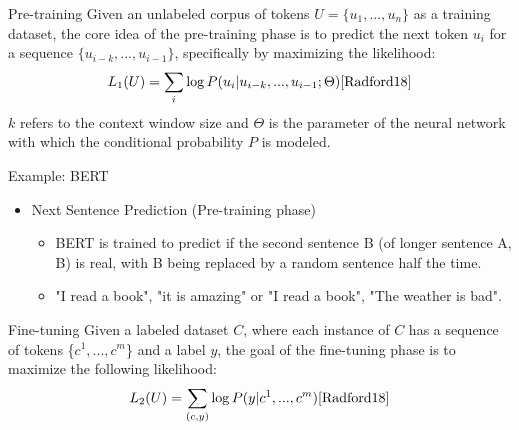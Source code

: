 \documentclass[t]{beamer}
\begin{document}
\begin{frame}{Pre-training}
Given an unlabeled corpus of tokens $U=\{u_1,...,u_n\}$ as a training dataset, the core idea of the pre-training phase is to 
predict the next token $u_i$ for a sequence $\{u_{i-k},...,u_{i-1}\}$, specifically by maximizing the likelihood: 
\begin{equation}
  L_1(U) = \sum_{i}\log{P(u_i|u_{i-k},...,u_{i-1}; \Theta)} \cite{Radford18}
\end{equation}
$k$ refers to the context window size and $\Theta$ is the parameter of the neural network with which the conditional probability $P$ is modeled.
\end{frame}


\begin{frame}{Example: BERT \cite{Devlin18}}
  \vspace{1cm}
  \begin{itemize}
    \item Next Sentence Prediction (Pre-training phase)
    \begin{itemize}
      \item BERT is trained to predict if the second sentence B (of longer sentence A, B) is real, with B being replaced by a random sentence half the time.
      \item "I read a book", "it is amazing" or "I read a book", "The weather is bad".
    \end{itemize}
  \end{itemize}
\end{frame}

\begin{frame}{Fine-tuning}
  Given a labeled dataset $C$,
  where each instance of $C$ has a sequence of tokens \{$c^1,...,c^m$\} and a label $y$, the goal of the fine-tuning phase is to maximize the following likelihood:
  \begin{equation}
    L_2(U) = \sum_{(c,y)}\log{P(y|c^1,...,c^m)} \cite{Radford18}
  \end{equation}
\end{frame}
\end{document}
